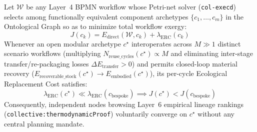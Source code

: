 \begin{theorem}
\label{thm:ch2-modular-convergence}
Let $\mathcal{W}$ be any Layer~4 BPMN workflow whose Petri-net solver (\texttt{col-execd}) selects among functionally equivalent component archetypes $\{c_1, \dots, c_m\}$ in the Ontological Graph so as to minimize total workflow exergy:
\begin{equation}
J(c_k) = E_{\mathrm{direct}}(\mathcal{W}, c_k) + \lambda_{\mathrm{ERC}}(c_k)
\label{eq:ch2-objective}
\end{equation}
Whenever an open modular archetype $c^{\star}$ interoperates across $M \gg 1$ distinct scenario workflows (multiplying $N_{\mathrm{reuse\_cycles}}(c^{\star}) \propto M$ and eliminating inter-stage transfer/re-packaging losses $\Delta E_{\mathrm{transfer}} > 0$) and permits closed-loop material recovery ($E_{\mathrm{recoverable\_stock}}(c^{\star}) \to E_{\mathrm{embodied}}(c^{\star})$), its per-cycle Ecological Replacement Cost satisfies:
\begin{equation}
\lambda_{\mathrm{ERC}}(c^{\star}) \ll \lambda_{\mathrm{ERC}}(c_{\mathrm{bespoke}}) \implies J(c^{\star}) < J(c_{\mathrm{bespoke}})
\end{equation}
Consequently, independent nodes browsing Layer~6 empirical lineage rankings (\texttt{collective:thermodynamicProof}) voluntarily converge on $c^{\star}$ without any central planning mandate.
\end{theorem}

